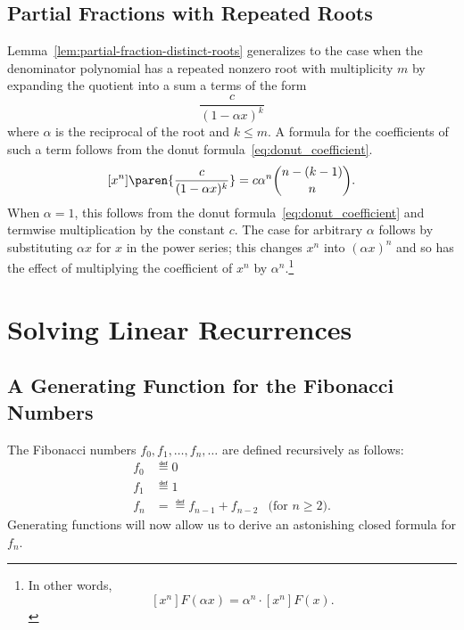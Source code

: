 \subsection{Partial Fractions with Repeated Roots}
Lemma~\ref{lem:partial-fraction-distinct-roots} generalizes to the
case when the denominator polynomial has a repeated nonzero root with
multiplicity $m$ by expanding the quotient into a sum a terms of the form
\[
\frac{c}{(1-\alpha x)^k}
\]
where $\alpha$ is the reciprocal of the root and $k \leq m$.
A formula for the coefficients of such a term follows
from the donut formula~\eqref{eq:donut_coefficient}.
\begin{equation}\label{c-alpha-k-coeff}
[x^n]\paren{\frac{c}{(1-\alpha x)^k}} = c \alpha^n \binom{n-(k-1)}{n}.
\end{equation}
When $\alpha = 1$, this follows from the donut
formula~\eqref{eq:donut_coefficient} and termwise multiplication by
the constant $c$.  The case for arbitrary $\alpha$ follows by
substituting $\alpha x$ for $x$ in the power series; this changes $x^n$ into
$(\alpha x)^n$ and so has the effect of multiplying the coefficient of
$x^n$ by $\alpha^n$.\footnote{In other words,
\[
[x^n]F(\alpha x) = \alpha^n \cdot [x^n]F(x).
\]}

\begin{problems}
\practiceproblems
{}

\classproblems
{}

\homeworkproblems
{}

\examproblems
{}

\end{problems}

\section{Solving Linear Recurrences}\label{sec:fibonacci}

\subsection{A Generating Function for the Fibonacci Numbers}

The Fibonacci numbers $f_0,f_1,\dots,f_n,\dots$ are defined recursively
as follows:
\begin{align*}
f_0 & \eqdef 0 \\
f_1 & \eqdef 1 \\
f_n & =\eqdef f_{n-1} + f_{n-2}
   & \text{(for $n \geq 2$)}.
\end{align*}
Generating functions will now allow us to derive an astonishing closed formula for $f_n$.

